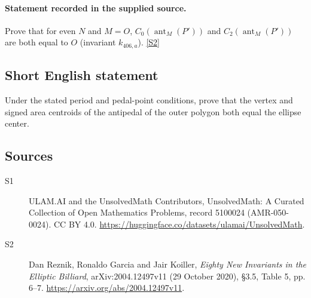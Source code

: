 \documentclass[11pt]{article}
\newcommand{\sref}[2]{\hyperlink{source:#1:#2}{[S#2]}}
\begin{document}
\paragraph{Statement recorded in the supplied source.}
Prove that for even $N$ and $M=O$, $C_0(\operatorname{ant}_M(P'))$ and $C_2(\operatorname{ant}_M(P'))$ are both equal to $O$ (invariant $k_{406,a}$). \sref{5100024}{2}
\subsection{Short English statement}
Under the stated period and pedal-point conditions, prove that the vertex and signed area centroids of the antipedal of the outer polygon both equal the ellipse center.
\subsection{Sources}
\begin{description}
\item[\hypertarget{source:5100024:1}{S1}] ULAM.AI and the UnsolvedMath Contributors, UnsolvedMath: A Curated Collection of Open Mathematics Problems, record 5100024 (AMR-050-0024). CC BY 4.0. \url{https://huggingface.co/datasets/ulamai/UnsolvedMath}.
\item[\hypertarget{source:5100024:2}{S2}] Dan Reznik, Ronaldo Garcia and Jair Koiller, \emph{Eighty New Invariants in the Elliptic Billiard}, arXiv:2004.12497v11 (29 October 2020), \S3.5, Table 5, pp. 6--7. \url{https://arxiv.org/abs/2004.12497v11}.
\end{description}
\label{end:5100024}
\end{document}
